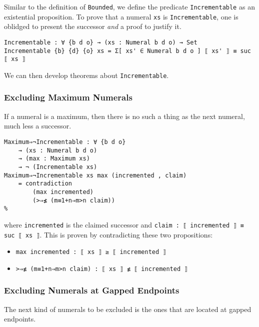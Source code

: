 \documentclass[\main/thesis.tex]{subfiles}
\begin{document}
Similar to the definition of \lstinline|Bounded|, we define the predicate
\lstinline|Incrementable| as an existential proposition.
To prove that a numeral \lstinline|xs| is \lstinline|Incrementable|,
one is oblidged to present the successor \textit{and} a proof to justify it.

\begin{lstlisting}[basicstyle=\ttfamily\scriptsize]
Incrementable : ∀ {b d o} → (xs : Numeral b d o) → Set
Incrementable {b} {d} {o} xs = Σ[ xs' ∈ Numeral b d o ] ⟦ xs' ⟧ ≡ suc ⟦ xs ⟧
\end{lstlisting}

We can then develop theorems about \lstinline|Incrementable|.

\subsubsection{Excluding Maximum Numerals}

If a numeral is a maximum, then there is no such a thing as the next numeral,
much less a successor.

\begin{lstlisting}
Maximum⇒¬Incrementable : ∀ {b d o}
    → (xs : Numeral b d o)
    → (max : Maximum xs)
    → ¬ (Incrementable xs)
Maximum⇒¬Incrementable xs max (incremented , claim)
    = contradiction
        (max incremented)
        (>⇒≰ (m≡1+n⇒m>n claim))
%
\end{lstlisting}
where \lstinline|incremented| is the claimed successor
and \lstinline|claim : ⟦ incremented ⟧ ≡ suc ⟦ xs ⟧|.
This is proven by contradicting these two propositions:

\begin{itemize}
    \item \lstinline|max incremented : ⟦ xs ⟧ ≥ ⟦ incremented ⟧|
    \item \lstinline|>⇒≰ (m≡1+n⇒m>n claim) : ⟦ xs ⟧ ≰ ⟦ incremented ⟧|
\end{itemize}

\subsubsection{Excluding Numerals at Gapped Endpoints}

The next kind of numerals to be excluded is the ones that are located at gapped
endpoints.

\begin{center}
    \begin{adjustbox}{max width=\textwidth}
    \end{adjustbox}
\end{center}
\end{document}
